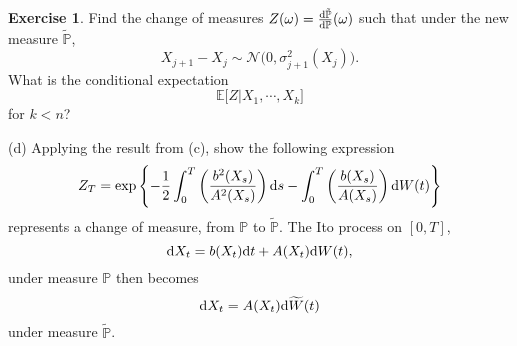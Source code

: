 \documentclass[12pt]{article}
\def\rd{{\rm d}}
\theoremstyle{definition}
\newtheorem{exer}{Exercise}
\theoremstyle{remark}
\begin{document}
\begin{exer}
	Find the change of measures $Z(\omega)=\frac{\rd\tilde{\mathbb{P}}}{\rd\mathbb{P}}(\omega)$ such that under the new measure
$\tilde{\mathbb{P}}$, 
\[
         X_{j+1}-X_j \sim \mathcal{N}\big(0,\sigma_{j+1}^2(X_j)\Big).
\]
What is the conditional expectation
\[
              \mathbb{E}\big[ Z| X_1,\cdots,X_k \big]
\]
for $k<n$?


(d)  Applying the result from (c), show the 
following expression
\[
            Z_T = \exp\left\{-\frac{1}{2}\int_0^T
                         \left(\frac{b^2(X_s)}{A^2(X_s)}\right)\rd s
           - \int_0^T \left(\frac{b(X_s)}{A(X_s)}\right)\rd W(t) \right\}
\]
represents a change of measure, from $\mathbb{P}$ to
$\tilde{\mathbb{P}}$.  The Ito process on $[0,T]$,
\[
         \rd X_t = b(X_t)\rd t + A(X_t)\rd W(t),
\]
under measure $\mathbb{P}$ then becomes
\[
       \rd X_t = A(X_t)\rd \widetilde{W}(t)
\]
under measure $\tilde{\mathbb{P}}$.
\end{exer}
\end{document}
